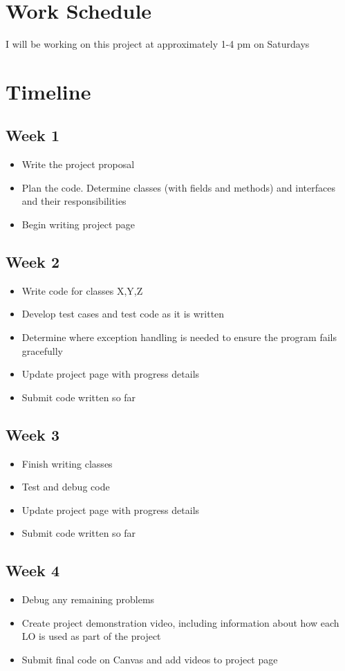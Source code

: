 \documentclass{article}
\begin{document}
\section{Work Schedule}
I will be working on this project at approximately 1-4 pm on Saturdays
\section{Timeline}
\subsection{Week 1}
\begin{itemize}
	\item Write the project proposal
	\item Plan the code. Determine classes (with fields and methods) and interfaces and their responsibilities
	\item Begin writing project page
\end{itemize}
\subsection{Week 2}
\begin{itemize}
	\item Write code for classes X,Y,Z
	\item Develop test cases and test code as it is written
	\item Determine where exception handling is needed to ensure the program fails gracefully
	\item Update project page with progress details
	\item Submit code written so far
\end{itemize}
\subsection{Week 3}
\begin{itemize}
	\item Finish writing classes
	\item Test and debug code
	\item Update project page with progress details
	\item Submit code written so far
\end{itemize}
\subsection{Week 4}
\begin{itemize}
	\item Debug any remaining problems
	\item Create project demonstration video, including information about how each LO is used as part of the project
	\item Submit final code on Canvas and add videos to project page
\end{itemize}
\end{document}
